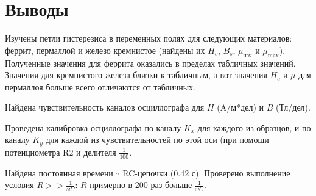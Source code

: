 \documentclass[12pt]{article}
\begin{document}
\section*{Выводы}

Изучены петли гистерезиса в переменных полях для следующих материалов: феррит, пермаллой и железо кремнистое (найдены их $H_c$, $B_s$, $\mu_\text{нач}$ и $\mu_\text{max}$).
Полученные значения для феррита оказались в пределах табличных значений. Значения для кремнистого железа близки к табличным, а вот значения $H_c$ и $\mu$ для пермаллоя больше всего отличаются от табличных.

Найдена чувствительность каналов осциллографа для $H$ (A/м*дел) и $B$ (Тл/дел).

Проведена калибровка осциллографа по каналу $K_x$ для каждого из образцов, и по каналу $K_y$ для каждой из чувствительностей по этой оси (при помощи потенциометра R2 и делителя $\frac{1}{100}$. 

Найдена постоянная времени $\tau$ RC-цепочки (0.42 с). Проверено выполнение условия $R >>\frac{1}{\omega C}$: $R$ примерно в 200 раз больше $\frac{1}{\omega C}$.
\end{document}
